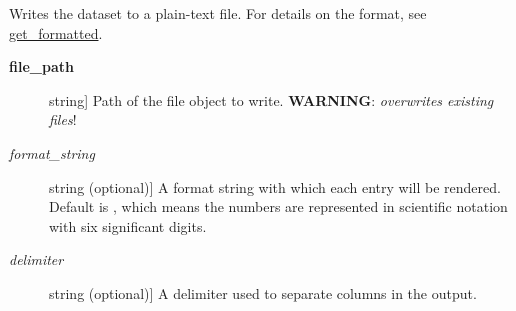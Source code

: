 \documentclass[a4paper,10pt,english]{sphinxmanual}
\begin{document}
\begin{fulllineitems}

\begin{fulllineitems}
\label{index:kafe.dataset.Dataset.write_formatted}
Writes the dataset to a plain-text file. For details on the format, see
{\hyperref[index:get-formatted]{get\_formatted}}.
\begin{description}
\item[{\textbf{file\_path}}] \leavevmode{[}string{]}
Path of the file object to write. \textbf{WARNING}: \emph{overwrites existing
files}!

\item[{\emph{format\_string}}] \leavevmode{[}string (optional){]}
A format string with which each entry will be rendered. Default is
, which means the numbers are represented in scientific
notation with six significant digits.

\item[{\emph{delimiter}}] \leavevmode{[}string (optional){]}
A delimiter used to separate columns in the output.

\end{description}

\end{fulllineitems}


\end{fulllineitems}

\end{document}
